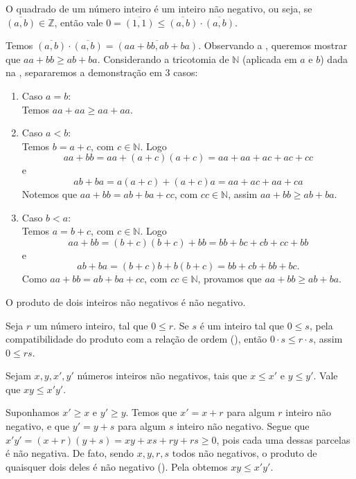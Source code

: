 \documentclass[../main.tex]{subfiles}
\begin{document}
\begin{prop}\label{int-prop-quadradoPositivo}
    O quadrado de um número inteiro é um inteiro não negativo, ou seja, se $\overline{(a,b)} \in \mathbb{Z}$, então vale $0 = \overline{(1,1)} \leq \overline{(a,b)} \cdot \overline{(a,b)}$. 
\end{prop}
\begin{dem}
    Temos $\overline{(a,b)} \cdot \overline{(a,b)} = \overline{(aa + bb, ab+ba)}$. Observando a , queremos mostrar que $aa+bb \geq ab+ba$. Considerando a tricotomia de $\mathbb{N}$ (aplicada em $a$ e $b$) dada na , separaremos a demonstração em 3 casos:
    \begin{enumerate}[label=(\roman*)]
        \item Caso $a=b$: \\
        Temos $aa+aa \geq aa+aa$.

        \item Caso $a < b$: \\
        Temos $b = a+c$, com $c \in \mathbb{N}$. Logo \\
        \[ aa+bb = aa+(a+c)(a+c) = aa+aa+ac+ac+cc \] 
        e
        \[ ab+ba = a(a+c)+(a+c)a = aa+ac+aa+ca \]
        Notemos que $aa+bb = ab+ba+cc$, com $cc \in \mathbb{N}$, assim $aa+bb \geq ab+ba$.

        \item Caso $b < a$: \\
        Temos $a = b+c$, com $c \in \mathbb{N}$. Logo
        \[ aa+bb = (b+c)(b+c) + bb = bb+bc+cb+cc+bb \]
        e
        \[ ab+ba = (b+c)b+b(b+c) = bb+cb+bb+bc. \]
        Como $aa+bb = ab+ba+cc$, com $cc \in \mathbb{N}$, provamos que $aa+bb \geq ab+ba$.
    \end{enumerate}
\end{dem}

\begin{prop}\label{int-prop-produtoPositivo}
    O produto de dois inteiros não negativos é não negativo.
\end{prop}
\begin{dem}
    Seja $r$ um número inteiro, tal que $0 \leq r$. Se $s$ é um inteiro tal que $0 \leq s$, pela compatibilidade do produto com a relação de ordem (), então $0 \cdot s \leq r \cdot s$, assim $0 \leq rs$.
\end{dem}
\begin{prop}\label{int-prop-produtoMaiores}
    Sejam $x, y, x', y'$ números inteiros não negativos, tais que $x \leq x'$ e $y \leq y'$. Vale que $xy \leq x'y'$.
\end{prop}
\begin{dem}
    Suponhamos $x' \geq x $ e $y' \geq y$. Temos que  $x' = x + r$ para algum $r$ inteiro não negativo, e que $y' = y+s$ para algum $s$ inteiro não negativo.
    Segue que $ x'y' = (x+r)(y+s) = xy+xs+ry+rs \geq 0$, pois cada uma dessas parcelas é não negativa. De fato, sendo $x,y,r,s$ todos não negativos,  o produto de quaisquer dois deles é não negativo (). Pela  obtemos $xy \leq x'y'$.
\end{dem}
\end{document}
